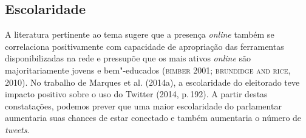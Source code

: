 
\subsection{Escolaridade}

A literatura pertinente ao tema sugere que a presença \textit{online} também se
correlaciona positivamente com capacidade de apropriação das ferramentas
disponibilizadas na rede e pressupõe que os mais ativos \textit{online} são
majoritariamente jovens e bem"-educados (\textsc{bimber} 2001; \textsc{brundidge and rice},
2010). No trabalho de Marques et al. (2014a), a escolaridade do
eleitorado teve impacto positivo sobre o uso do Twitter (2014, p.\,192). A
partir destas constatações, podemos prever que uma maior escolaridade do
parlamentar aumentaria suas chances de estar conectado e também
aumentaria o número de \textit{tweets}.

